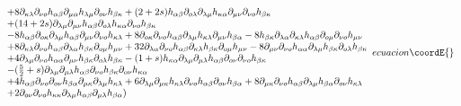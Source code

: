 \documentclass[a4paper,12pt]{article}
\begin{document}
\begin{equation}
{\begin{array}{l}
   + 8\partial _{\kappa\lambda} \partial _{\nu o} h_{\alpha\beta} \partial _{\mu\alpha} h_{\lambda\mu} \partial _{ o\nu} h_{\beta\kappa}  + (2 + 2s)h_{\alpha\beta} \partial _{ o\lambda} \partial _{\lambda\mu} h_{\kappa\alpha} \partial _{\mu\nu} \partial _{\nu o} h_{\beta\kappa} \\ + (14 + 2s)\partial _{\lambda\mu} \partial _{\mu\nu} h_{\alpha\beta} \partial _{ o\lambda} h_{\kappa\alpha} \partial _{\nu o} h_{\beta\kappa}  \\
   - 8h_{\alpha\beta} \partial _{ o\kappa} \partial _{\lambda\mu} h_{\alpha\beta} \partial _{\mu\nu} \partial _{\nu o} h_{\kappa\lambda}  + 8\partial _{ o\kappa} \partial _{\nu o} h_{\alpha\beta} \partial _{\lambda\mu} h_{\kappa\lambda} \partial _{\mu\nu} h_{\beta\alpha}  - 8h_{\beta\kappa} \partial _{\lambda\alpha} \partial _{\kappa\lambda} h_{\alpha\beta} \partial _{ o\mu} \partial _{\nu o} h_{\mu\nu}   \\
   + 8\partial _{\kappa\lambda} \partial _{\nu o} h_{\alpha\beta} \partial _{\lambda\alpha} h_{\beta\kappa} \partial _{ o\mu} h_{\mu\nu}  + 32\partial _{\lambda\alpha} \partial _{\nu o} h_{\alpha\beta} \partial _{\kappa\lambda} h_{\beta\kappa} \partial _{ o\mu} h_{\mu\nu}  - 8\partial _{\mu\nu} \partial _{\nu o} h_{\alpha\alpha} \partial _{\lambda\mu} h_{\beta\kappa} \partial _{ o\lambda} h_{\beta\kappa}  \\
   + 4\partial _{\lambda\mu} \partial _{\nu o} h_{\alpha\alpha} \partial _{\mu\nu} h_{\beta\kappa} \partial _{ o\lambda} h_{\beta\kappa}  - (1 + s)h_{\kappa\alpha} \partial _{\lambda\mu} \partial _{\mu\lambda} h_{\alpha\beta} \partial _{ o\nu} \partial _{\nu o} h_{\beta\kappa} \\ - (\frac{5}
{2} + s)\partial _{\lambda\mu} \partial _{\mu\lambda} h_{\alpha\beta} \partial _{\nu o} h_{\beta\kappa} \partial _{ o\nu} h_{\kappa\alpha}   \\
   + 4h_{\alpha\beta} \partial _{\nu o} \partial _{ o\nu} h_{\beta\alpha} \partial _{\mu\kappa} \partial _{\lambda\mu} h_{\kappa\lambda}  + 6\partial _{\lambda\mu} \partial _{\mu\kappa} h_{\kappa\lambda} \partial _{\nu o} h_{\alpha\beta} \partial _{ o\nu} h_{\beta\alpha}  + 8\partial _{\mu\kappa} \partial _{\nu o} h_{\alpha\beta} \partial _{\lambda\mu} h_{\beta\alpha} \partial _{ o\nu} h_{\kappa\lambda}  \\
   + 2\partial _{ o\nu} \partial _{\nu o} h_{\kappa\kappa} \partial _{\lambda\mu} h_{\alpha\beta} \partial _{\mu\lambda} h_{\beta\alpha})  \\
\end{array}
}{ecuacion}\coordE{}\end{equation}
\end{document}
